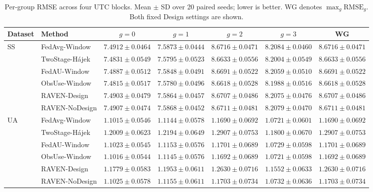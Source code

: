 \begin{table}[t]
\centering
\caption{Per-group RMSE across four UTC blocks.
Mean $\pm$ SD over 20 paired seeds; lower is better.
WG denotes $\max_g\mathrm{RMSE}_g$. Both fixed Design settings are shown.}
\label{tab:app_block_rmse}
\footnotesize
\setlength{\tabcolsep}{4pt}
\begin{tabular*}{\textwidth}{@{\extracolsep{\fill}}llccccc}
\toprule
Dataset & Method & $g{=}0$ & $g{=}1$ & $g{=}2$ & $g{=}3$ & WG\\
\midrule
\multirow{6}{*}{SS}
& FedAvg-Window & $7.4912{\pm}0.0464$ & $7.5873{\pm}0.0444$ & $8.6716{\pm}0.0471$ & $8.2084{\pm}0.0460$ & $8.6716{\pm}0.0471$\\
& TwoStage-H\'ajek & $7.4831{\pm}0.0549$ & $7.5795{\pm}0.0523$ & $8.6633{\pm}0.0556$ & $8.2004{\pm}0.0549$ & $8.6633{\pm}0.0556$\\
& FedAU-Window & $7.4887{\pm}0.0512$ & $7.5848{\pm}0.0491$ & $8.6691{\pm}0.0522$ & $8.2059{\pm}0.0510$ & $8.6691{\pm}0.0522$\\
& ObsUse-Window & $7.4815{\pm}0.0517$ & $7.5780{\pm}0.0496$ & $8.6618{\pm}0.0528$ & $8.1988{\pm}0.0516$ & $8.6618{\pm}0.0528$\\
& RAVEN-Design & $7.4903{\pm}0.0479$ & $7.5864{\pm}0.0457$ & $8.6707{\pm}0.0486$ & $8.2075{\pm}0.0476$ & $8.6707{\pm}0.0486$\\
& RAVEN-NoDesign & $7.4907{\pm}0.0474$ & $7.5868{\pm}0.0452$ & $8.6711{\pm}0.0481$ & $8.2079{\pm}0.0470$ & $8.6711{\pm}0.0481$\\
\midrule
\multirow{6}{*}{UA}
& FedAvg-Window & $1.1015{\pm}0.0546$ & $1.1144{\pm}0.0578$ & $1.1690{\pm}0.0692$ & $1.0721{\pm}0.0601$ & $1.1690{\pm}0.0692$\\
& TwoStage-H\'ajek & $1.2009{\pm}0.0623$ & $1.2194{\pm}0.0649$ & $1.2907{\pm}0.0753$ & $1.1800{\pm}0.0670$ & $1.2907{\pm}0.0753$\\
& FedAU-Window & $1.1023{\pm}0.0545$ & $1.1153{\pm}0.0576$ & $1.1701{\pm}0.0689$ & $1.0729{\pm}0.0598$ & $1.1701{\pm}0.0689$\\
& ObsUse-Window & $1.1016{\pm}0.0544$ & $1.1145{\pm}0.0576$ & $1.1692{\pm}0.0689$ & $1.0721{\pm}0.0598$ & $1.1692{\pm}0.0689$\\
& RAVEN-Design & $1.1779{\pm}0.0583$ & $1.1953{\pm}0.0611$ & $1.2630{\pm}0.0716$ & $1.1552{\pm}0.0633$ & $1.2630{\pm}0.0716$\\
& RAVEN-NoDesign & $1.1025{\pm}0.0578$ & $1.1155{\pm}0.0611$ & $1.1703{\pm}0.0734$ & $1.0732{\pm}0.0636$ & $1.1703{\pm}0.0734$\\
\bottomrule
\end{tabular*}
\end{table}


